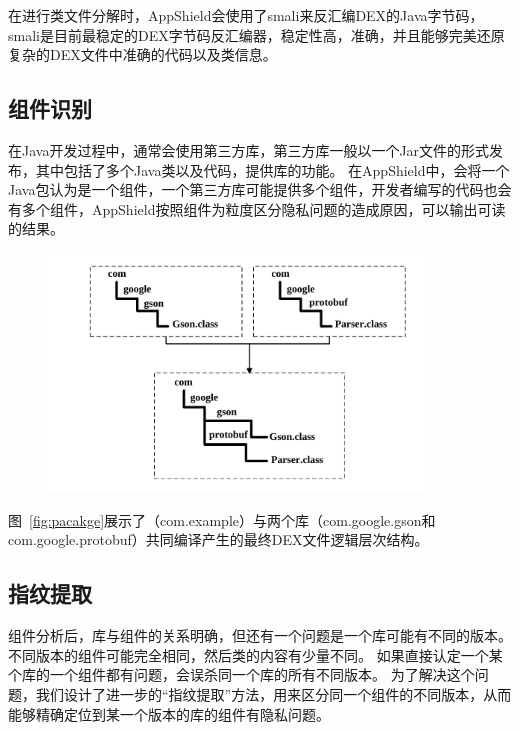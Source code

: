 在进行类文件分解时，AppShield会使用了smali来反汇编DEX的Java字节码，smali是目前最稳定的DEX字节码反汇编器，稳定性高，准确，并且能够完美还原复杂的DEX文件中准确的代码以及类信息。

\subsection{组件识别}

在Java开发过程中，通常会使用第三方库，第三方库一般以一个Jar文件的形式发布，其中包括了多个Java类以及代码，提供库的功能。
在AppShield中，会将一个Java包认为是一个组件，一个第三方库可能提供多个组件，开发者编写的代码也会有多个组件，AppShield按照组件为粒度区分隐私问题的造成原因，可以输出可读的结果。

\begin{figure}
	\centering
	\includegraphics[width=0.9\textwidth]{figure/package.pdf}
\end{figure}


图~\ref{fig:pacakge}展示了（com.example）与两个库（com.google.gson和com.google.protobuf）共同编译产生的最终DEX文件逻辑层次结构。

\subsection{指纹提取}

组件分析后，库与组件的关系明确，但还有一个问题是一个库可能有不同的版本。
不同版本的组件可能完全相同，然后类的内容有少量不同。
如果直接认定一个某个库的一个组件都有问题，会误杀同一个库的所有不同版本。
为了解决这个问题，我们设计了进一步的“指纹提取”方法，用来区分同一个组件的不同版本，从而能够精确定位到某一个版本的库的组件有隐私问题。


